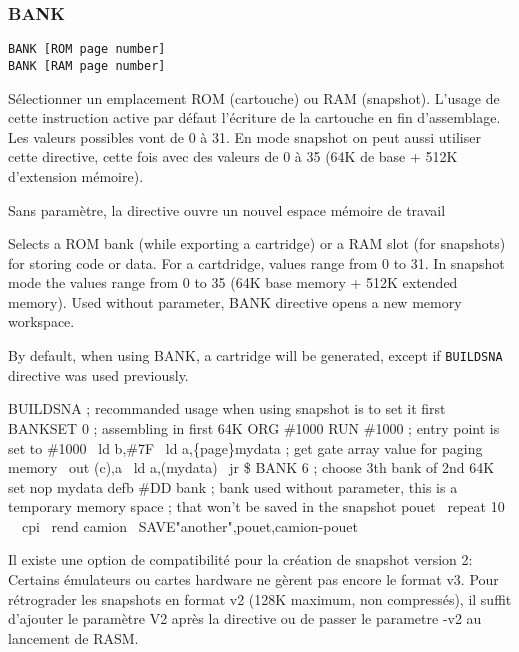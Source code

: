 \subsubsection{BANK}\label{BANK}
\begin{verbatim}
BANK [ROM page number]
BANK [RAM page number]
\end{verbatim}

\begin{xfr}
Sélectionner un emplacement ROM (cartouche) ou RAM (snapshot). L'usage de cette instruction active par défaut l'écriture de la cartouche en fin d'assemblage.
Les valeurs possibles vont de 0 à 31. En mode snapshot on peut aussi utiliser cette directive, cette fois avec des valeurs de 0 à 35 (64K de base + 512K d'extension mémoire).

Sans paramètre, la directive ouvre un nouvel espace mémoire de travail
\end{xfr}

\begin{xen}
Selects a ROM bank (while exporting a cartridge) or a RAM slot (for snapshots) for storing code or data. 
For a cartdridge, values range from 0 to 31. In snapshot mode the values range from 0 to 35 (64K base memory + 512K extended memory). Used without parameter, BANK directive opens a new memory workspace.

By default, when using BANK, a cartridge will be generated, except if \texttt{BUILDSNA} directive was used previously.

\end{xen}

\begin{code}
BUILDSNA ; recommanded usage when using snapshot is to set it first
BANKSET 0 ; assembling in first 64K
ORG \#1000
RUN \#1000 ; entry point is set to \#1000
\medskip
\ ld b,\#7F
\ ld a,\{page\}mydata ; get gate array value for paging memory
\ out (c),a
\ ld a,(mydata)
\ jr \$
\medskip
BANK 6 ; choose 3th bank of 2nd 64K set
nop
mydata defb \#DD
\medskip
bank 
; bank used without parameter, this is a temporary memory space
; that won't be saved in the snapshot
\medskip
pouet
\  repeat 10
\ \ cpi
\ rend
camion
\ SAVE"another",pouet,camion-pouet
\end{code}

\begin{xfr}
Il existe une option de compatibilité pour la création de snapshot version 2: Certains émulateurs ou cartes hardware ne gèrent pas encore le format v3. Pour rétrograder les snapshots en format v2 (128K maximum, non compressés), il suffit d'ajouter le paramètre V2 après la directive ou de passer le parametre -v2 au lancement de RASM.
\end{xfr}

